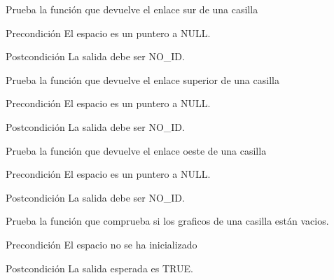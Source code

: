 \begin{DoxyRefList}
\item[\label{test__test000290}%
\hypertarget{test__test000290}{}%
Global \hyperlink{space__test_8c_a40fe07c07c1069023b362a9e506c4c59}{test2\-\_\-space\-\_\-get\-\_\-south} ()]Prueba la función que devuelve el enlace sur de una casilla \begin{DoxyPrecond}{Precondición}
El espacio es un puntero a N\-U\-L\-L. 
\end{DoxyPrecond}
\begin{DoxyPostcond}{Postcondición}
La salida debe ser N\-O\-\_\-\-I\-D.  
\end{DoxyPostcond}

\item[\label{test__test000299}%
\hypertarget{test__test000299}{}%
Global \hyperlink{space__test_8c_a293a03e22f1bc96f193cc84abfd23fa4}{test2\-\_\-space\-\_\-get\-\_\-up} ()]Prueba la función que devuelve el enlace superior de una casilla \begin{DoxyPrecond}{Precondición}
El espacio es un puntero a N\-U\-L\-L. 
\end{DoxyPrecond}
\begin{DoxyPostcond}{Postcondición}
La salida debe ser N\-O\-\_\-\-I\-D.  
\end{DoxyPostcond}

\item[\label{test__test000296}%
\hypertarget{test__test000296}{}%
Global \hyperlink{space__test_8c_af1cf02b01c007aec0684186b39666c32}{test2\-\_\-space\-\_\-get\-\_\-west} ()]Prueba la función que devuelve el enlace oeste de una casilla \begin{DoxyPrecond}{Precondición}
El espacio es un puntero a N\-U\-L\-L. 
\end{DoxyPrecond}
\begin{DoxyPostcond}{Postcondición}
La salida debe ser N\-O\-\_\-\-I\-D.  
\end{DoxyPostcond}

\item[\label{test__test000315}%
\hypertarget{test__test000315}{}%
Global \hyperlink{space__test_8c_a646b5636b450d7053458bdeb72b30e76}{test2\-\_\-space\-\_\-graphics\-\_\-are\-Empty} ()]Prueba la función que comprueba si los graficos de una casilla están vacios. \begin{DoxyPrecond}{Precondición}
El espacio no se ha inicializado 
\end{DoxyPrecond}
\begin{DoxyPostcond}{Postcondición}
La salida esperada es T\-R\-U\-E.  
\end{DoxyPostcond}


\end{DoxyRefList}
